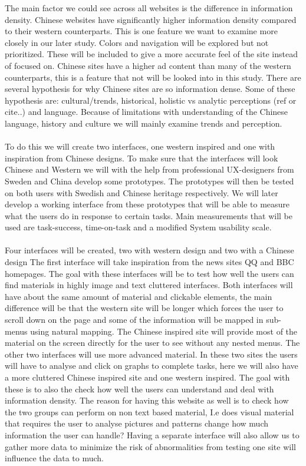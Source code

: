  The main factor we could see across all websites is the difference in information density. Chinese websites have significantly higher information density compared to their western counterparts. This is one feature we want to examine more closely in our later study. Colors and navigation will be explored but not prioritized. These will be included to give a more accurate feel of the site instead of focused on. Chinese sites have a higher ad content than many of the western counterparts, this is a feature that not will be looked into in this study.   There are several hypothesis for why Chinese sites are so information dense. Some of these hypothesis are: cultural/trends, historical, holistic vs analytic perceptions (ref or cite..) and language. Because of limitations with understanding of the Chinese language, history and culture we will mainly examine trends and perception.
 \\\\
  To do this we will create two interfaces, one western inspired and one with inspiration from Chinese designs. To make sure that the interfaces will look Chinese and Western we will with the help from professional UX-designers from Sweden and China develop some prototypes. The prototypes will then be tested on both users with Swedish and Chinese heritage respectively. We will later develop a working interface from these prototypes that will be able to measure what the users do in response to certain tasks. Main measurements that will be used are task-success, time-on-task and a modified System usability scale. \cite{brooke1996sus} 
  \\\\
  Four interfaces will be created, two with western design and two with a Chinese design The first interface will take inspiration from the news sites QQ and BBC homepages. The goal with these interfaces will be to test how well the users can find materials in highly image and text cluttered interfaces. Both interfaces will have about the same amount of material and clickable elements, the main difference will be that the western site will be longer which forces the user to scroll down on the page and some of the information will be mapped in sub-menus using natural mapping. \cite{Norman} The Chinese inspired site will provide most of the material on the screen directly for the user to see without any nested menus.  The other two interfaces will use more advanced material. In these two sites the users will have to analyse and click on graphs to complete tasks, here we will also have a more cluttered Chinese inspired site and one western inspired. The goal with these is to also the check how well the users can understand and deal with information density. The reason for having this website as well is to check how the two groups can perform on non text based material, I.e does visual material that requires the user to analyse pictures and patterns change how much information the user can handle? Having a separate interface will also allow us to gather more data to minimize the risk of abnormalities from testing one site will influence the data to much.
